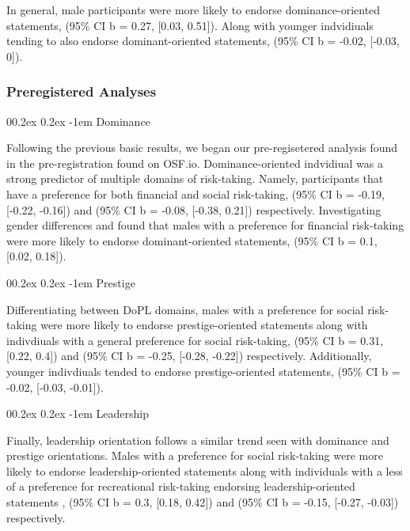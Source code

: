 \documentclass[
  donotrepeattitle,doc, 12pt, a4paper,floatsintext]{apa7}
\makeatletter
\let\oldparagraph\paragraph
\renewcommand{\paragraph}[1]{\oldparagraph{#1}\mbox{}}
\renewcommand{\paragraph}{\@startsection{paragraph}{4}{\parindent}%
  {0\baselineskip \@plus 0.2ex \@minus 0.2ex}%
  {-1em}%
  {\normalfont\normalsize\bfseries\itshape\typesectitle}}
\makeatother
\begin{document}
In general, male participants were more likely to endorse dominance-oriented statements, (95\% CI b = 0.27, {[}0.03, 0.51{]}). Along with younger indvidiuals tending to also endorse dominant-oriented statements, (95\% CI b = -0.02, {[}-0.03, 0{]}).

\hypertarget{preregistered-analyses-2}{%
\subsubsection{Preregistered Analyses}\label{preregistered-analyses-2}}

\hypertarget{dominance-1}{%
\paragraph{Dominance}\label{dominance-1}}

Following the previous basic results, we began our pre-regisetered analysis found in the pre-registration found on OSF.io. Dominance-oriented indvidiual was a strong predictor of multiple domains of risk-taking. Namely, participants that have a preference for both financial and social risk-taking, (95\% CI b = -0.19, {[}-0.22, -0.16{]}) and (95\% CI b = -0.08, {[}-0.38, 0.21{]}) respectively. Investigating gender differences and found that males with a preference for financial risk-taking were more likely to endorse dominant-oriented statements, (95\% CI b = 0.1, {[}0.02, 0.18{]}).

\hypertarget{prestige-1}{%
\paragraph{Prestige}\label{prestige-1}}

Differentiating between DoPL domains, males with a preference for social risk-taking were more likely to endorse prestige-oriented statements along with indivdiuals with a general preference for social risk-taking, (95\% CI b = 0.31, {[}0.22, 0.4{]}) and (95\% CI b = -0.25, {[}-0.28, -0.22{]}) respectively. Additionally, younger indivdiuals tended to endorse prestige-oriented statements, (95\% CI b = -0.02, {[}-0.03, -0.01{]}).

\hypertarget{leadership-1}{%
\paragraph{Leadership}\label{leadership-1}}

Finally, leadership orientation follows a similar trend seen with dominance and prestige orientations. Males with a preference for social risk-taking were more likely to endorse leadership-oriented statements along with individuals with a less of a preference for recreational risk-taking endorsing leadership-oriented statements , (95\% CI b = 0.3, {[}0.18, 0.42{]}) and (95\% CI b = -0.15, {[}-0.27, -0.03{]}) respectively.
\end{document}
